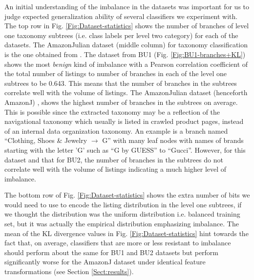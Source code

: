 An initial understanding of the imbalance in the datasets was important for us to judge expected generalization ability of several classifiers we experiment with. 
The top row in Fig. \ref{Fig:Dataset-statistics} shows the number of branches of level one taxonomy subtrees (i.e. class labels per level two category) for each of the datasets.
The AmazonJulian dataset (middle column) for taxonomy classification is the one obtained from \cite{Julian15}.
The dataset from BU1 (Fig. \ref{Fig:BU1-branches+KL}) shows the most \textit{benign} kind of imbalance with a Pearson correlation coefficient of the total number of listings to number of branches in each of the level one subtrees to be 0.643.
This means that the number of branches in the subtrees correlate well with the volume of listings.
The AmazonJulian dataset (henceforth AmazonJ) \cite{Julian15}, shows the highest number of branches in the subtrees on average.
This is possible since the extracted taxonomy may be a reflection of the navigational taxonomy which usually is listed in crawled product pages, instead of an internal data organization taxonomy.
An example is a branch named ``Clothing, Shoes \& Jewelry $\rightarrow$ G'' with many leaf nodes with names of brands starting with the letter 'G' such as ``G by GUESS'' to ``Gucci''.
However, for this dataset and that for BU2, the number of branches in the subtrees do not correlate well with the volume of listings indicating a much higher level of imbalance.

The bottom row of Fig. \ref{Fig:Dataset-statistics} shows the extra number of bits we would need to use to encode the listing distribution in the level one subtrees, if we thought the distribution was the uniform distribution i.e. balanced training set, but it was actually the empirical distribution emphasizing imbalance.
The mean of the KL divergence values in Fig. \ref{Fig:Dataset-statistics} hint towards the fact that, on average, classifiers that are more or less resistant to imbalance should perform about the same for BU1 and BU2 datasets but perform significantly worse for the AmazonJ dataset under identical feature transformations (see Section \ref{Sect:results}).
